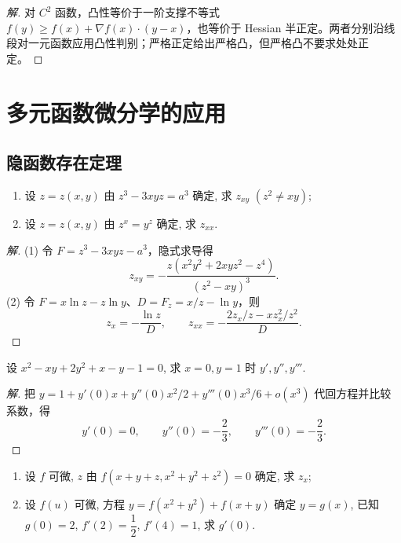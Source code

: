 \documentclass[../../数学分析培优讲义(答案版).tex]{subfiles}
\begin{document}
\begin{proof}[解]
对 $C^2$ 函数，凸性等价于一阶支撑不等式 $f(y)\geq f(x)+\nabla f(x)\cdot(y-x)$，也等价于 Hessian 半正定。两者分别沿线段对一元函数应用凸性判别；严格正定给出严格凸，但严格凸不要求处处正定。
\end{proof}

\newpage

\section{多元函数微分学的应用}

\subsection{隐函数存在定理}


\begin{example}
\begin{enumerate}[label=(\arabic*)]
    \item 设 $z=z(x,y)$ 由 $z^3-3xyz=a^3$ 确定, 求 $z_{xy}$ $(z^2\ne xy)$;
    \item 设 $z=z(x,y)$ 由 $z^x=y^z$ 确定, 求 $z_{xx}$.
\end{enumerate}
\end{example}

\begin{proof}[解]
(1) 令 $F=z^3-3xyz-a^3$，隐式求导得
\[
z_{xy}=-\dfrac{z(x^2y^2+2xyz^2-z^4)}{(z^2-xy)^3}.
\]
(2) 令 $F=x\ln z-z\ln y$、$D=F_z=x/z-\ln y$，则
\[
z_x=-\dfrac{\ln z}{D},\qquad
z_{xx}=-\dfrac{2z_x/z-xz_x^2/z^2}{D}.
\]
\end{proof}

\begin{example}
设 $x^2-xy+2y^2+x-y-1=0$, 求 $x=0,y=1$ 时 $y',y'',y'''$.
\end{example}

\begin{proof}[解]
把 $y=1+y'(0)x+y''(0)x^2/2+y'''(0)x^3/6+o(x^3)$ 代回方程并比较系数，得
\[
y'(0)=0,\qquad y''(0)=-\dfrac{2}{3},\qquad y'''(0)=-\dfrac{2}{3}.
\]
\end{proof}

\begin{example}
\begin{enumerate}[label=(\arabic*)]
    \item 设 $f$ 可微, $z$ 由 $f(x+y+z,x^2+y^2+z^2)=0$ 确定, 求 $z_x$;
    \item 设 $f(u)$ 可微, 方程 $y=f(x^2+y^2)+f(x+y)$ 确定 $y=g(x)$, 已知 $g(0)=2$, $f'(2)=\dfrac{1}{2}$, $f'(4)=1$, 求 $g'(0)$.
\end{enumerate}
\end{example}
\end{document}
